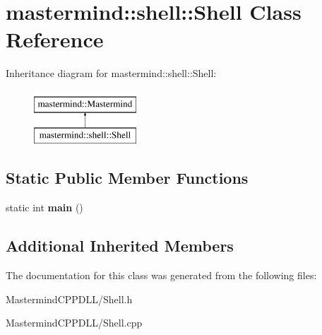 \hypertarget{classmastermind_1_1shell_1_1_shell}{}\section{mastermind\+:\+:shell\+:\+:Shell Class Reference}
\label{classmastermind_1_1shell_1_1_shell}
Inheritance diagram for mastermind\+:\+:shell\+:\+:Shell\+:\begin{figure}[H]
\begin{center}
\leavevmode
\includegraphics[height=2.000000cm]{classmastermind_1_1shell_1_1_shell}
\end{center}
\end{figure}
\subsection*{Static Public Member Functions}
\begin{DoxyCompactItemize}
\item 
\hypertarget{classmastermind_1_1shell_1_1_shell_aa47488e9975693b33445e871951ec9cd}{}\label{classmastermind_1_1shell_1_1_shell_aa47488e9975693b33445e871951ec9cd} 
static int {\bfseries main} ()
\end{DoxyCompactItemize}
\subsection*{Additional Inherited Members}


The documentation for this class was generated from the following files\+:\begin{DoxyCompactItemize}
\item 
Mastermind\+C\+P\+P\+D\+L\+L/Shell.\+h\item 
Mastermind\+C\+P\+P\+D\+L\+L/Shell.\+cpp\end{DoxyCompactItemize}
